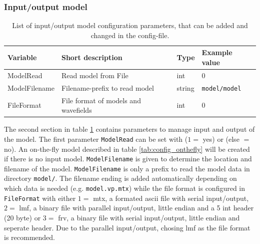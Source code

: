 \documentclass[pdftex,a4paper,parskip,listof=totoc,bibliography=totoc,onehalfspacing,12pt]{scrreprt}
\newcommand{\shellcmd}[1]{\indent\indent\texttt{#1}}	%
\begin{document}
\subsubsection{Input/output model}
\begin{table}[h!]
\caption[List of input/output model configuration parameters.]{List of input/output model configuration parameters, that can be added and changed in the config-file.}\label{tab:config_inputoutput}
\centering
\begin{adjustbox}{width=0.8\textwidth,center=\textwidth}
	\begin{tabular}{llll}
	\toprule
	Variable & Short description & Type & Example value \\
	\midrule	 
	ModelRead& Read model from File  & int & \num{0}\\
	ModelFilename& Filename-prefix to read model & string & \shellcmd{model/model}\\
	FileFormat&  File format of models and wavefields & int & \num{0}\\
	\bottomrule
	\end{tabular}
	\end{adjustbox}
\end{table}
The second section in table \ref{tab:config_inputoutput} contains parameters to manage input and output of the model. The first parameter \verb+ModelRead+ can be set with ($1=$ yes) or (else $=$ no). An on-the-fly model described in table \ref{tab:config_onthefly} will be created if there is no input model. \verb+ModelFilename+ is given to determine the location and filename of the model. \verb+ModelFilename+ is only a prefix to read the model data in directory \shellcmd{model/}. The filename ending is added automatically depending on which data is needed (e.g. \shellcmd{model.vp.mtx}) while the file format is configured in \verb+FileFormat+ with either $1=$ mtx, a formated ascii file with serial input/output, $2=$ lmf, a binary file with parallel input/output, little endian and a 5 int header (20 byte) or $3=$ frv, a binary file with serial input/output,  little endian and seperate header. Due to the parallel input/output, chosing lmf as the file format is recommended.
\end{document}
